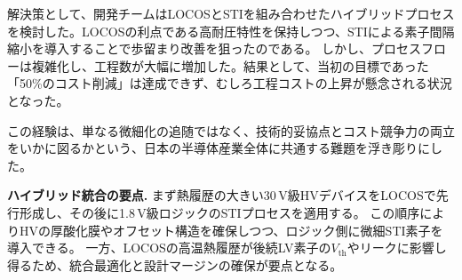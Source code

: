 \documentclass[conference]{IEEEtran}
\begin{document}
解決策として、開発チームはLOCOSとSTIを組み合わせたハイブリッドプロセスを検討した。LOCOSの利点である高耐圧特性を保持しつつ、STIによる素子間隔縮小を導入することで歩留まり改善を狙ったのである。  
しかし、プロセスフローは複雑化し、工程数が大幅に増加した。結果として、当初の目標であった「50\%のコスト削減」は達成できず、むしろ工程コストの上昇が懸念される状況となった。

この経験は、単なる微細化の追随ではなく、技術的妥協点とコスト競争力の両立をいかに図るかという、日本の半導体産業全体に共通する難題を浮き彫りにした。

\noindent\textbf{ハイブリッド統合の要点.}
まず熱履歴の大きい30\,V級HVデバイスをLOCOSで先行形成し、その後に1.8\,V級ロジックのSTIプロセスを適用する。
この順序によりHVの厚酸化膜やオフセット構造を確保しつつ、ロジック側に微細STI素子を導入できる。
一方、LOCOSの高温熱履歴が後続LV素子の$V_{\mathrm{th}}$やリークに影響し得るため、統合最適化と設計マージンの確保が要点となる。
\end{document}
